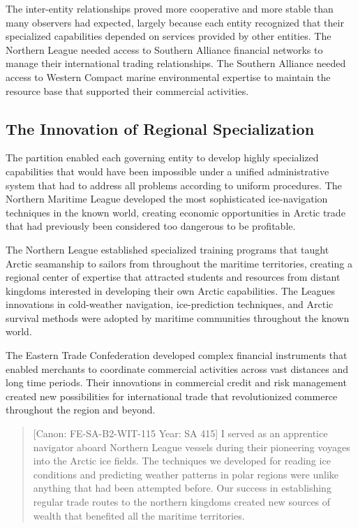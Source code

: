 The inter-entity relationships proved more cooperative and more stable
than many observers had expected, largely because each entity recognized
that their specialized capabilities depended on services provided by
other entities. The Northern League needed access to Southern Alliance
financial networks to manage their international trading relationships.
The Southern Alliance needed access to Western Compact marine
environmental expertise to maintain the resource base that supported
their commercial activities.

\subsection{The Innovation of Regional
Specialization}\label{the-innovation-of-regional-specialization}

The partition enabled each governing entity to develop highly
specialized capabilities that would have been impossible under a unified
administrative system that had to address all problems according to
uniform procedures. The Northern Maritime League developed the most
sophisticated ice-navigation techniques in the known world, creating
economic opportunities in Arctic trade that had previously been
considered too dangerous to be profitable.

The Northern League established specialized training programs that
taught Arctic seamanship to sailors from throughout the maritime
territories, creating a regional center of expertise that attracted
students and resources from distant kingdoms interested in developing
their own Arctic capabilities. The League\textquotesingle s innovations
in cold-weather navigation, ice-prediction techniques, and Arctic
survival methods were adopted by maritime communities throughout the
known world.

The Eastern Trade Confederation developed complex financial instruments
that enabled merchants to coordinate commercial activities across vast
distances and long time periods. Their innovations in commercial credit
and risk management created new possibilities for international trade
that revolutionized commerce throughout the region and beyond.

\begin{quote}
{[}Canon: FE-SA-B2-WIT-115 \textbar{} Year: SA 415{]} I served as an
apprentice navigator aboard Northern League vessels during their
pioneering voyages into the Arctic ice fields. The techniques we
developed for reading ice conditions and predicting weather patterns in
polar regions were unlike anything that had been attempted before. Our
success in establishing regular trade routes to the northern kingdoms
created new sources of wealth that benefited all the maritime
territories.
\end{quote}

